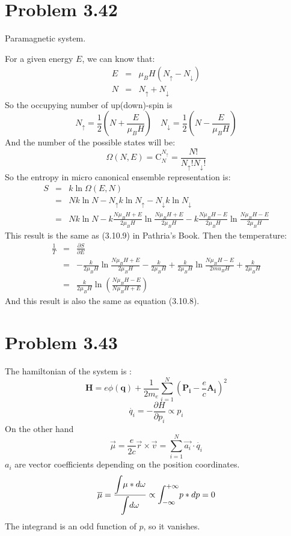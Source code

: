 \documentclass{article}
\begin{document}
\section*{Problem 3.42}
	Paramagnetic system.

	For a given energy $E$, we can know that:
	\begin{eqnarray}
	E &=& \mu_B H (N_{\uparrow}-N_\downarrow)\\
	N &=& N_\uparrow + N_\downarrow
	\end{eqnarray}
	So the occupying number of up(down)-spin is
	$$
	N_\uparrow = \frac{1}{2}\left(N+\frac{E}{\mu_B H}\right)\quad N_\downarrow = \frac{1}{2}\left(N-\frac{E}{\mu_B H}\right)
	$$
	And the number of the possible states will be:
	\begin{equation}
	\Omega(N,E) = \mathrm{C}_{N}^{N_\uparrow}=\frac{N!}{N_\uparrow !N_\downarrow!}
	\end{equation}
	So the entropy in micro canonical ensemble representation is:
	\begin{eqnarray}
	S &=& k\ln\Omega(E,N) \nonumber\\
	&=& Nk\ln N -N_\uparrow k \ln N_\uparrow - N_\downarrow k \ln N_\downarrow\nonumber\\
	&=& Nk\ln N -k\frac{N\mu_B H +E}{2\mu_B H}\ln \frac{N\mu_B H +E}{2\mu_B H}-k\frac{N\mu_B H -E}{2\mu_B H}\ln\frac{N\mu_B H -E}{2\mu_B H}
	\end{eqnarray}
	This result is the same as (3.10.9) in Pathria's Book. Then the temperature:
	\begin{eqnarray}
	\frac{1}{T} &=& \frac{\partial S}{\partial E}\nonumber\\
	&=&-\frac{k}{2\mu_B H}\ln \frac{N\mu_B H +E}{2\mu_B H}-\frac{k}{2\mu_B H}+\frac{k}{2\mu_BH}\ln\frac{N\mu_B H-E}{2
	mu_B H}+\frac{k}{2\mu_BH}\nonumber\\
	&=&\frac{k}{2\mu_BH}\ln\left(\frac{N\mu_BH-E}{N\mu_BH+E}\right)
	\end{eqnarray}
	And this result is also the same as equation (3.10.8).


\section*{Problem 3.43} %
\label{sec:problem_3_43}
	The hamiltonian of the system is :
	$$\boldsymbol{H}=e\phi (\boldsymbol{q})+\frac{1}{2m_e}\sum_{i=1}^{N}(\boldsymbol{P_i}-\frac{e}{c}\boldsymbol{A_i})^2$$
	$$\dot{q_i}=-\frac{\partial{H}}{\partial{p_i}}\propto p_i$$
	On the other hand 
	$$\vec\mu=\frac{e}{2c}\vec{r}\times\vec{v}=\sum_{i=1}^{N}\vec{a_i}\cdot \dot{q_i}$$
	$a_i$ are vector coefficients depending on the position coordinates.
	$$\overline\mu=\frac{\mathlarger{\int}\mu*d\omega}{\mathlarger{\int}d\omega}\propto\mathlarger{\int_{ - \infty }^{ + \infty }}p*dp=0$$
	The integrand is an odd function of $p$, so it vanishes.
\end{document}
